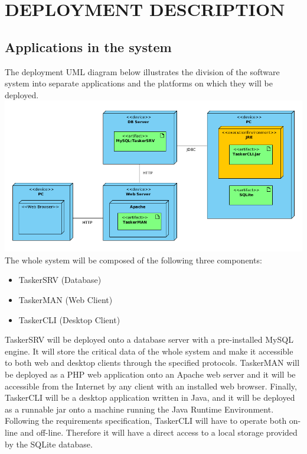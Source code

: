 \documentclass{project}
\begin{document}
\section{DEPLOYMENT DESCRIPTION}
\subsection{Applications in the system}
The deployment UML diagram below illustrates the division of the software 
system into separate applications and the platforms on which they will be
deployed. \\
\includegraphics[width=\textwidth]{images/4.1/DeploymentDiagram} \\
The whole system will be composed of the following three components:
\begin{itemize}
	\item TaskerSRV (Database)
	\item TaskerMAN (Web Client)
	\item TaskerCLI (Desktop Client)
\end{itemize} 
TaskerSRV will be deployed onto a database server with a pre-installed MySQL
engine. It will store the critical data of the whole system and make it
accessible to both web and desktop clients through the specified protocols.
TaskerMAN will be deployed as a PHP web application onto an Apache web server
and it will be accessible from the Internet by any client with an installed web 
browser. Finally, TaskerCLI will be a desktop application written in Java, and it
will be deployed as a runnable jar onto a machine running the Java Runtime
Environment. Following the requirements specification\cite{se.qa.rs}, TaskerCLI will have to
operate both on-line and off-line. Therefore it will have a direct access to 
a local storage provided by the SQLite database.
\end{document}
